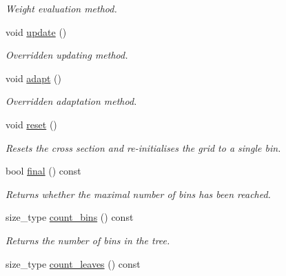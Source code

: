 \begin{DoxyCompactItemize}
\begin{DoxyCompactList}\small\item\em Weight evaluation method. \end{DoxyCompactList}\item 
\hypertarget{a00384_af822f4f960486248dca03ad88f540490}{void \hyperlink{a00384_af822f4f960486248dca03ad88f540490}{update} ()}\label{a00384_af822f4f960486248dca03ad88f540490}

\begin{DoxyCompactList}\small\item\em Overridden updating method. \end{DoxyCompactList}\item 
\hypertarget{a00384_ac4e18aea382a72432206a12155c96076}{void \hyperlink{a00384_ac4e18aea382a72432206a12155c96076}{adapt} ()}\label{a00384_ac4e18aea382a72432206a12155c96076}

\begin{DoxyCompactList}\small\item\em Overridden adaptation method. \end{DoxyCompactList}\item 
void \hyperlink{a00384_a20085d35f326d5b467678943aea0988b}{reset} ()
\begin{DoxyCompactList}\small\item\em Resets the cross section and re-\/initialises the grid to a single bin. \end{DoxyCompactList}\item 
\hypertarget{a00384_acc9b24dc736b986b4cf1aa24961ad0b2}{bool \hyperlink{a00384_acc9b24dc736b986b4cf1aa24961ad0b2}{final} () const }\label{a00384_acc9b24dc736b986b4cf1aa24961ad0b2}

\begin{DoxyCompactList}\small\item\em Returns whether the maximal number of bins has been reached. \end{DoxyCompactList}\item 
\hypertarget{a00384_a32899fe91db543728ceee00eea56c053}{size\-\_\-type \hyperlink{a00384_a32899fe91db543728ceee00eea56c053}{count\-\_\-bins} () const }\label{a00384_a32899fe91db543728ceee00eea56c053}

\begin{DoxyCompactList}\small\item\em Returns the number of bins in the tree. \end{DoxyCompactList}\item 
\hypertarget{a00384_a642f8f4cd35382674d1eeac8d8a3afd6}{size\-\_\-type \hyperlink{a00384_a642f8f4cd35382674d1eeac8d8a3afd6}{count\-\_\-leaves} () const }\label{a00384_a642f8f4cd35382674d1eeac8d8a3afd6}


\end{DoxyCompactItemize}

